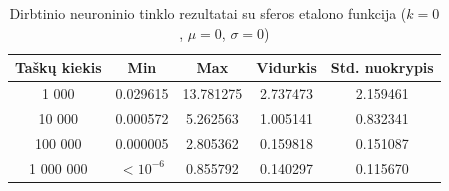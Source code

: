 \begin{table}[H]
    \centering
    \begin{tabular}{|c|c|c|c|c|}
        \hline
        \textbf{Taškų kiekis} & \textbf{Min} & \textbf{Max} & \textbf{Vidurkis} & \textbf{Std. nuokrypis} \\ \hline
        1 000        & 0.029615 & 13.781275 & 2.737473 & 2.159461 \\ \hline
        10 000       & 0.000572 & 5.262563 & 1.005141 & 0.832341 \\ \hline
        100 000      & 0.000005 & 2.805362 & 0.159818 & 0.151087 \\ \hline
        1 000 000    & $<10^{-6}$ & 0.855792 & 0.140297 & 0.115670 \\ \hline
    \end{tabular}
    \caption{Dirbtinio neuroninio tinklo rezultatai su sferos etalono funkcija ($k = 0$, $\mu = 0$, $\sigma = 0$)}
\end{table}